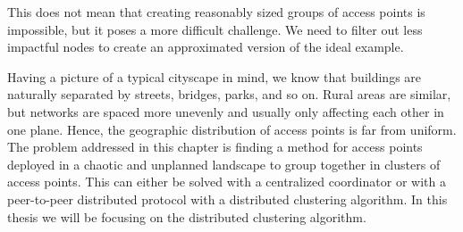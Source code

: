 This does not mean that creating reasonably sized groups of access points is impossible, but it poses a more difficult challenge. 
We need to filter out less impactful nodes to create an approximated version of the ideal example.

Having a picture of a typical cityscape in mind, we know that buildings are naturally separated by streets, bridges, parks, and so on. Rural areas are similar, but networks are spaced more unevenly and usually only affecting each other in one plane. Hence, the geographic distribution of access points is far from uniform. The problem addressed in this chapter is finding a method for access points deployed in a chaotic and unplanned landscape to group together in clusters of access points. This can either be solved with a centralized coordinator or with a peer-to-peer distributed protocol with a distributed clustering algorithm. In this thesis we will be focusing on the distributed clustering algorithm. 

%
%
%

